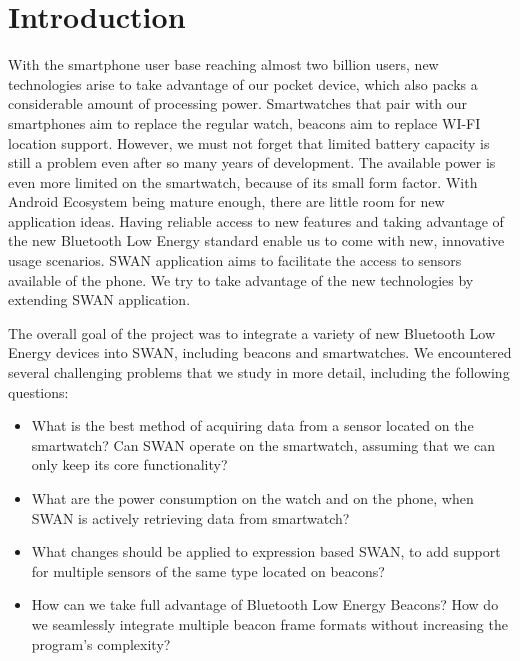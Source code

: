 
\chapter{Introduction} %

\label{Chapter1} %


With the smartphone user base reaching almost two billion users, new technologies arise to take advantage of our pocket device, which also packs a considerable amount of processing power.
Smartwatches that pair with our smartphones aim to replace the regular watch, beacons aim to replace WI-FI location support. 
However, we must not forget that limited battery capacity is still a problem even after so many years of development. The available power is even more limited on the smartwatch, because of
its small form factor.
With Android Ecosystem being mature enough, there are little room for new application ideas. Having reliable access to new features and taking advantage of the new Bluetooth Low Energy standard
enable us to come with new, innovative usage scenarios. SWAN application aims to facilitate the access to sensors available of the phone.
We try to take advantage of the new technologies by extending SWAN application.

The overall goal of the project was to integrate a variety of new Bluetooth Low Energy devices into SWAN,
including beacons and smartwatches. We encountered several challenging problems that we study in more detail,
including the following questions:

\begin{itemize}
 \item What is the best method of acquiring data from a sensor located on the smartwatch? Can SWAN operate on the smartwatch, assuming that we can only keep its core functionality?
 \item What are the power consumption on the watch and on the  phone, when SWAN is actively retrieving data from smartwatch?
 \item What changes should be applied to expression based SWAN, to add support for multiple sensors of the same type located on beacons?
 \item How can we take full advantage of Bluetooth Low Energy Beacons? How do we seamlessly integrate multiple beacon frame formats without increasing the program's complexity?
\end{itemize}

